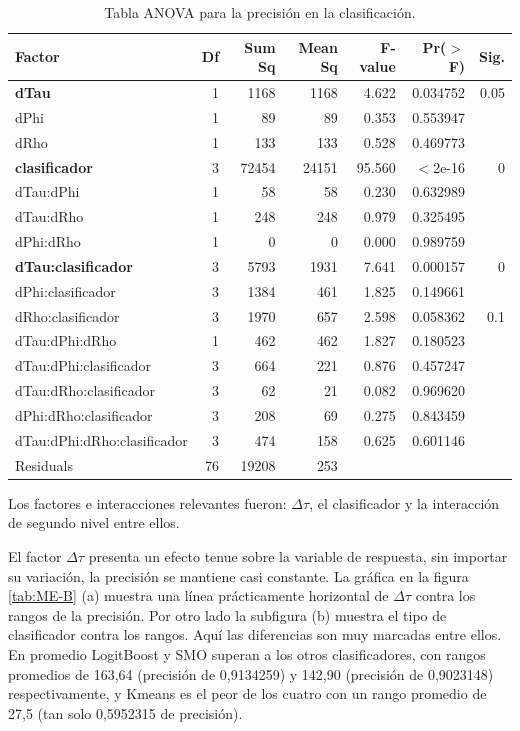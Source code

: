 \begin{table}\renewcommand{\tabcolsep}{3pt}
    \centering
    \small
    \begin{tabular}{lrrrrrr}
        \hline 
        Factor & Df & Sum Sq & Mean Sq & F-value & Pr($>$F) & Sig.\\
        \hline 
        \textbf{dTau} & 1 & 1168 & 1168 & 4.622 & 0.034752 & 0.05\\
        dPhi & 1 & 89 & 89 & 0.353 & 0.553947 &\\
        dRho & 1 & 133 & 133 & 0.528 & 0.469773 &\\
        \textbf{clasificador} & 3 & 72454 & 24151 & 95.560 & $<$2e-16 & 0\\
        dTau:dPhi & 1 & 58 & 58 & 0.230 & 0.632989 &\\
        dTau:dRho & 1 & 248 & 248 & 0.979 & 0.325495 &\\
        dPhi:dRho & 1 & 0 & 0 & 0.000 & 0.989759 &\\
        \textbf{dTau:clasificador} & 3 & 5793 & 1931 & 7.641 & 0.000157 & 0\\
        dPhi:clasificador & 3 & 1384 & 461 & 1.825 & 0.149661 &\\
        dRho:clasificador & 3 & 1970 & 657 & 2.598 & 0.058362 & 0.1\\
        dTau:dPhi:dRho & 1 & 462 & 462 & 1.827 & 0.180523 & \\
        dTau:dPhi:clasificador & 3 & 664 & 221 & 0.876 & 0.457247 & \\
        dTau:dRho:clasificador & 3 & 62 & 21 & 0.082 & 0.969620 & \\
        dPhi:dRho:clasificador & 3 & 208 & 69 & 0.275 & 0.843459 & \\
        dTau:dPhi:dRho:clasificador & 3 & 474 & 158 & 0.625 & 0.601146 & \\
        Residuals & 76 & 19208 & 253\\
        \hline
    \end{tabular}
    \caption{Tabla ANOVA para la precisión en la clasificación.}
    \label{tab:anovaB}    
\end{table}


Los factores e interacciones relevantes fueron: $\Delta \tau$, el clasificador y la interacción de segundo nivel entre ellos.

El factor $\Delta \tau$ presenta un efecto tenue sobre la variable de respuesta, sin importar su variación, la precisión se mantiene casi constante. La gráfica en la figura \ref{tab:ME-B} (a) muestra una línea prácticamente horizontal de $\Delta \tau$ contra los rangos de la precisión. 
Por otro lado la subfigura (b) muestra el tipo de clasificador contra los rangos. Aquí las diferencias son muy marcadas entre ellos. 
En promedio LogitBoost y SMO superan a los otros clasificadores, con rangos promedios de 163,64 (precisión de 0,9134259) y 142,90 (precisión de 0,9023148) respectivamente, y Kmeans es el peor de los cuatro con un rango promedio de 27,5 (tan solo 0,5952315 de precisión). 


